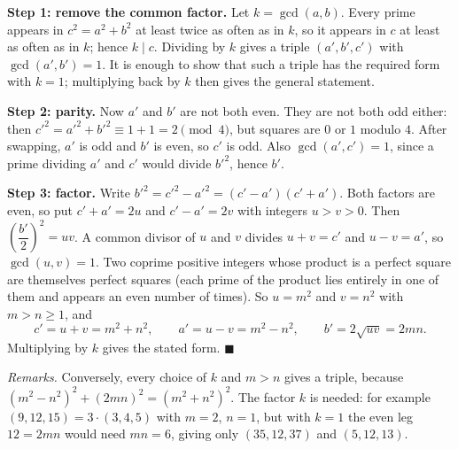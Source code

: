 \textbf{Step 1: remove the common factor.} Let $k=\gcd(a,b)$. Every prime appears in $c^2=a^2+b^2$ at least twice as often as in $k$, so it appears in $c$ at least as often as in $k$; hence $k\mid c$. Dividing by $k$ gives a triple $\left(a',b',c'\right)$ with $\gcd(a',b')=1$. It is enough to show that such a triple has the required form with $k=1$; multiplying back by $k$ then gives the general statement.

\textbf{Step 2: parity.} Now $a'$ and $b'$ are not both even. They are not both odd either: then $c'^2=a'^2+b'^2\equiv1+1=2\pmod4$, but squares are $0$ or $1$ modulo $4$. After swapping, $a'$ is odd and $b'$ is even, so $c'$ is odd. Also $\gcd(a',c')=1$, since a prime dividing $a'$ and $c'$ would divide $b'^2$, hence $b'$.

\textbf{Step 3: factor.} Write $b'^2=c'^2-a'^2=(c'-a')(c'+a')$. Both factors are even, so put $c'+a'=2u$ and $c'-a'=2v$ with integers $u>v>0$. Then $\left(\dfrac{b'}{2}\right)^2=uv$. A common divisor of $u$ and $v$ divides $u+v=c'$ and $u-v=a'$, so $\gcd(u,v)=1$. Two coprime positive integers whose product is a perfect square are themselves perfect squares (each prime of the product lies entirely in one of them and appears an even number of times). So $u=m^2$ and $v=n^2$ with $m>n\ge1$, and
\[c'=u+v=m^2+n^2,\qquad a'=u-v=m^2-n^2,\qquad b'=2\sqrt{uv}=2mn .\]
Multiplying by $k$ gives the stated form. $\blacksquare$

\emph{Remarks.} Conversely, every choice of $k$ and $m>n$ gives a triple, because $\left(m^2-n^2\right)^2+(2mn)^2=\left(m^2+n^2\right)^2$. The factor $k$ is needed: for example $(9,12,15)=3\cdot(3,4,5)$ with $m=2$, $n=1$, but with $k=1$ the even leg $12=2mn$ would need $mn=6$, giving only $(35,12,37)$ and $(5,12,13)$.
